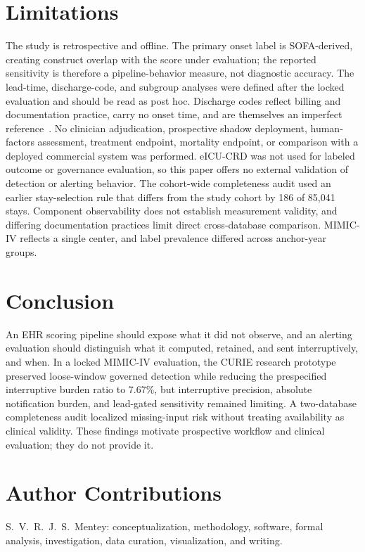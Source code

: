 \documentclass[journal]{IEEEtran}
\newcommand{\systemname}{CURIE}
\begin{document}
\section{Limitations}

The study is retrospective and offline. The primary onset label is
SOFA-derived, creating construct overlap with the score under evaluation; the
reported sensitivity is therefore a pipeline-behavior measure, not diagnostic
accuracy. The lead-time, discharge-code, and subgroup analyses were defined
after the locked evaluation and should be read as post hoc. Discharge codes
reflect billing and documentation practice, carry no onset time, and are
themselves an imperfect reference~\cite{rhee2017,johnson2018sepsis}. No
clinician adjudication, prospective shadow deployment, human-factors
assessment, treatment endpoint, mortality endpoint, or comparison with a
deployed commercial system was performed. eICU-CRD was not used for labeled
outcome or governance evaluation, so this paper offers no external validation
of detection or alerting behavior. The cohort-wide completeness audit used an
earlier stay-selection rule that differs from the study cohort by 186 of
85,041 stays. Component observability does not establish measurement
validity, and differing documentation practices limit direct cross-database
comparison. MIMIC-IV reflects a single center, and label prevalence differed
across anchor-year groups.

\section{Conclusion}

An EHR scoring pipeline should expose what it did not observe, and an
alerting evaluation should distinguish what it computed, retained, and sent
interruptively, and when. In a locked MIMIC-IV evaluation, the \systemname{}
research prototype preserved loose-window governed detection while reducing
the prespecified interruptive burden ratio to 7.67\%, but interruptive
precision, absolute notification burden, and lead-gated sensitivity remained
limiting. A two-database completeness audit localized missing-input risk
without treating availability as clinical validity. These findings motivate
prospective workflow and clinical evaluation; they do not provide it.

\section*{Author Contributions}
S.~V.~R.~J.~S.~Mentey: conceptualization, methodology, software, formal
analysis, investigation, data curation, visualization, and writing.
\end{document}
